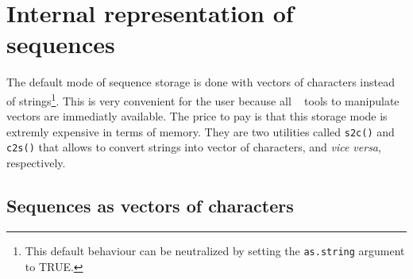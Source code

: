 \documentclass{article}
\begin{document}
\section{Internal representation of sequences}

The default mode of sequence storage is done with vectors of characters instead of strings\footnote{
This default behaviour can be neutralized by setting the \texttt{as.string} argument to TRUE.
}.
This is very convenient for the user because all \Rlogo{}~ tools to manipulate vectors are immediatly available. 
The price to pay is that this storage mode is extremly expensive in terms of memory.
They are two utilities called \texttt{s2c()} and \texttt{c2s()} that allows to convert strings into 
vector of characters, and \textit{vice versa}, respectively.

\subsection{Sequences as vectors of characters}
\end{document}
